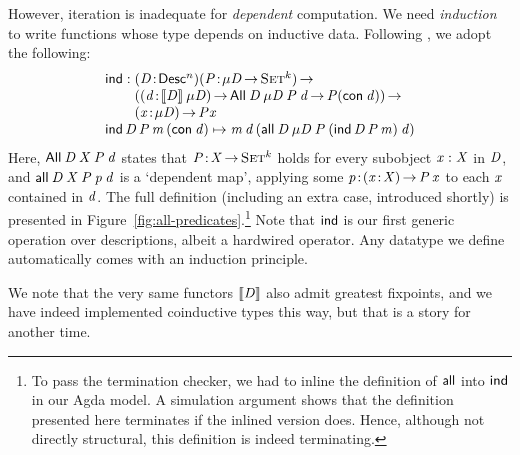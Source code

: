 \newcommand{\SYMBind}{\F{ind}}

However, iteration is inadequate for \emph{dependent} computation.
We need \emph{induction} to write functions whose type depends on inductive
data. Following \citet{benke:universe-generic-prog}, we adopt the following:
%
\[\stk{
\F{ind} : \stk{ \PITEL{\V{D}}{\Desc^n}
                \PI{\V{P}}{\Mu{\V{D}} \To \Set^k}         \\
               (\PI{\V{d}}{\descop{\V{D}}{\Mu{\V{D}}}}       
                \All{\V{D}}{\Mu{\V{D}}}{\V{P}}{\V{d}} \To \V{P} (\Con{\V{d}})) \To \\
               \PI{\V{x}}{\Mu{\V{D}}} \V{P} \V{x} 
} \\
\F{ind}\, \V{D}\, \V{P}\, \V{m}\, (\Con{\V{d}}) \mapsto 
    \V{m}\, \V{d}\, (\all{\V{D}}{\Mu{\V{D}}}{\V{P}}
                           {(\F{ind}\, \V{D}\, \V{P}\, \V{m})}
                           {\V{d}})
}\]
%
Here, $\All{\V{D}}{\V{X}}{\V{P}}{\V{d}}$ states that
$\Bhab{\V{P}}{\V{X} \To \Set^k}$ holds for every subobject $\V{x}:\V{X}$
in \(\V{D}\), and \(\all{\V{D}}{\V{X}}{\V{P}}{\V{p}}{\V{d}}\) is a
`dependent map', applying some
\(\Bhab{\V{p}}{\PIS{\Bhab{\x}{\V{X}}}\V{P}\,\V{x}}\) to each \(\x\)
contained in \(\V{d}\). The full definition (including an extra case,
introduced shortly) is presented in
Figure~\ref{fig:all-predicates}.\footnote{To pass the termination
  checker, we had to inline the definition of $\SYMBall$ into
  $\SYMBind$ in our Agda model. A simulation argument shows that the
  definition presented here terminates if the inlined version
  does. Hence, although not directly structural, this definition is
  indeed terminating.} Note that $\SYMBind$ is our first generic
operation over descriptions, albeit a hardwired operator.  Any
datatype we define automatically comes with an induction principle.

We note that the very same functors \(\SYMBdescop{\M{D}}\) also admit greatest
fixpoints, and we have indeed implemented coinductive types this way, but
that is a story for another time.

